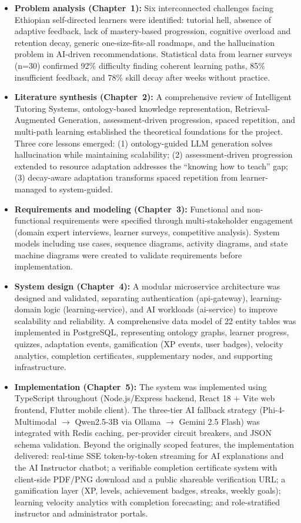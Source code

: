 \begin{itemize}
    \item \textbf{Problem analysis (Chapter~1):} Six interconnected challenges facing Ethiopian self-directed learners were identified: tutorial hell, absence of adaptive feedback, lack of mastery-based progression, cognitive overload and retention decay, generic one-size-fits-all roadmaps, and the hallucination problem in AI-driven recommendations. Statistical data from learner surveys (n=30) confirmed 92\% difficulty finding coherent learning paths, 85\% insufficient feedback, and 78\% skill decay after weeks without practice.
    \item \textbf{Literature synthesis (Chapter~2):} A comprehensive review of Intelligent Tutoring Systems, ontology-based knowledge representation, Retrieval-Augmented Generation, assessment-driven progression, spaced repetition, and multi-path learning established the theoretical foundations for the project. Three core lessons emerged: (1) ontology-guided LLM generation solves hallucination while maintaining scalability; (2) assessment-driven progression extended to resource adaptation addresses the ``knowing how to teach'' gap; (3) decay-aware adaptation transforms spaced repetition from learner-managed to system-guided.
    \item \textbf{Requirements and modeling (Chapter~3):} Functional and non-functional requirements were specified through multi-stakeholder engagement (domain expert interviews, learner surveys, competitive analysis). System models including use cases, sequence diagrams, activity diagrams, and state machine diagrams were created to validate requirements before implementation.
    \item \textbf{System design (Chapter~4):} A modular microservice architecture was designed and validated, separating authentication (api-gateway), learning-domain logic (learning-service), and AI workloads (ai-service) to improve scalability and reliability. A comprehensive data model of 22 entity tables was implemented in PostgreSQL, representing ontology graphs, learner progress, quizzes, adaptation events, gamification (XP events, user badges), velocity analytics, completion certificates, supplementary nodes, and supporting infrastructure.
    \item \textbf{Implementation (Chapter~5):} The system was implemented using TypeScript throughout (Node.js/Express backend, React 18 + Vite web frontend, Flutter mobile client). The three-tier AI fallback strategy (Phi-4-Multimodal $\rightarrow$ Qwen2.5-3B via Ollama $\rightarrow$ Gemini 2.5 Flash) was integrated with Redis caching, per-provider circuit breakers, and JSON schema validation. Beyond the originally scoped features, the implementation delivered: real-time SSE token-by-token streaming for AI explanations and the AI Instructor chatbot; a verifiable completion certificate system with client-side PDF/PNG download and a public shareable verification URL; a gamification layer (XP, levels, achievement badges, streaks, weekly goals); learning velocity analytics with completion forecasting; and role-stratified instructor and administrator portals.

\end{itemize}
